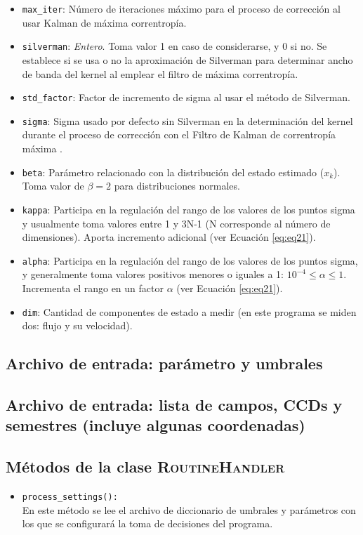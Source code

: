 \begin{appendix}
\begin{itemize}
\item \texttt{max\_iter}: N\'umero de iteraciones m\'aximo para el proceso de correcci\'on al usar Kalman de m\'axima correntrop\'ia. 
\item \texttt{silverman}: \textit{Entero}. Toma valor 1 en caso de considerarse, y 0 si no. Se establece si se usa o no la aproximaci\'on de Silverman para determinar ancho de banda del kernel al emplear el filtro de m\'axima correntrop\'ia.
\item \texttt{std\_factor}: Factor de incremento de sigma al usar el m\'etodo de Silverman.
\item \texttt{sigma}: Sigma usado por defecto sin Silverman en la determinaci\'on del kernel durante el proceso de correcci\'on con el Filtro de Kalman de correntrop\'ia m\'axima .
\item \texttt{beta}: Par\'ametro relacionado con la distribuci\'on del estado estimado ($x_k$). Toma valor de $\beta = 2$ para distribuciones normales.
\item \texttt{kappa}: Participa en la regulaci\'on del rango de los valores de los puntos sigma y usualmente toma valores entre 1 y 3N-1 (N corresponde al n\'umero de dimensiones)\cite{wan}. Aporta incremento adicional (ver Ecuaci\'on \ref{eq:eq21}).
\item \texttt{alpha}: Participa en la regulaci\'on del rango de los valores de los puntos sigma, y generalmente toma valores positivos menores o iguales a 1: $10^{-4} \leq \alpha \leq 1 $\cite{wan}. Incrementa el rango en un factor $\alpha$ (ver Ecuaci\'on \ref{eq:eq21}).
\item \texttt{dim}: Cantidad de componentes de estado a medir (en este programa se miden dos: flujo y su velocidad).
\end{itemize}
\subsection{Archivo de entrada: par\'ametro y umbrales}
\label{subs:settings_file}
\subsection{Archivo de entrada: lista de campos, CCDs y semestres (incluye algunas coordenadas)}
\label{subs:sn_list}

\subsection{M\'etodos de la clase \textsc{RoutineHandler}}
\label{subs:a4}
\begin{itemize}
\item \texttt{process\_settings():}\\
En este m\'etodo se lee el archivo de diccionario de umbrales y par\'ametros con los que se configurar\'a la toma de decisiones del programa.
\bigskip


\end{itemize}
\end{appendix}
